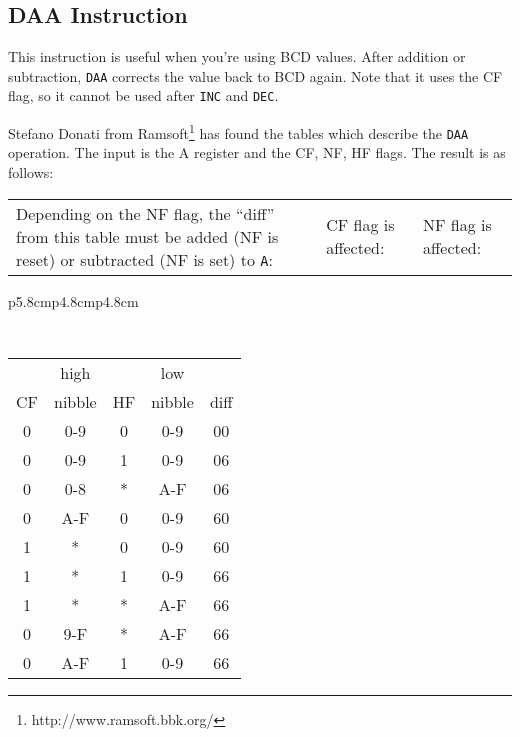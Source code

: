 \subsection{DAA Instruction}
\label{daa}

This instruction is useful when you're using BCD values. After addition or subtraction, {\tt DAA} corrects the value back to BCD again.  Note that it uses the CF flag, so it cannot be used after {\tt INC} and {\tt DEC}.

Stefano Donati from Ramsoft\footnote{http://www.ramsoft.bbk.org/} has found the tables which describe the {\tt DAA} operation. The input is the A register and the CF, NF, HF flags. The result is as follows:

{
	\footnotesize

	\begin{tabular}{b{5.8cm}b{4.8cm}b{4.8cm}}
		Depending on the NF flag, the ``diff'' from this table must be added (NF is reset) or subtracted (NF is set) to {\tt A}:
		&
		CF flag is affected:
		&
		NF flag is affected: \\
	\end{tabular}

	\begin{tabular}{p{5.8cm}p{4.8cm}p{4.8cm}}

		{\tt
			\begin{tabular}[t]{c|c|c|c|c}
				   &  high   &    & low    &  \\
				CF &  nibble & HF & nibble & diff \\
				\hline
				0 & 0-9     &  0 & 0-9    &  00  \\
				0 & 0-9     &  1 & 0-9    &  06  \\
				0 & 0-8     &  * & A-F    &  06  \\
				0 & A-F     &  0 & 0-9    &  60  \\
				1 &  *      &  0 & 0-9    &  60  \\
				1 &  *      &  1 & 0-9    &  66  \\
				1 &  *      &  * & A-F    &  66  \\
				0 & 9-F     &  * & A-F    &  66  \\
				0 & A-F     &  1 & 0-9    &  66  \\
				\hline
			\end{tabular}
		}


\end{tabular}}
